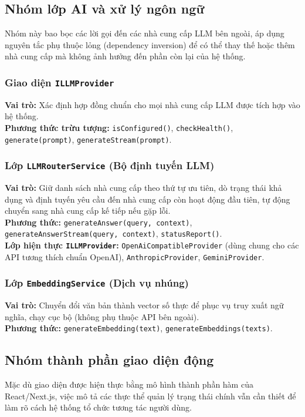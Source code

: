 \subsection{Nhóm lớp AI và xử lý ngôn ngữ}
Nhóm này bao bọc các lời gọi đến các nhà cung cấp LLM bên ngoài, áp dụng nguyên tắc phụ thuộc lỏng (dependency inversion) để có thể thay thế hoặc thêm nhà cung cấp mà không ảnh hưởng đến phần còn lại của hệ thống.

\subsubsection{Giao diện \texttt{ILLMProvider}}
    \noindent\textbf{Vai trò:} Xác định hợp đồng chuẩn cho mọi nhà cung cấp LLM được tích hợp vào hệ thống.\\
    \textbf{Phương thức trừu tượng:} \texttt{isConfigured()}, \texttt{checkHealth()}, \texttt{generate(prompt)}, \texttt{generateStream(prompt)}.

\subsubsection{Lớp \texttt{LLMRouterService} (Bộ định tuyến LLM)}
    \noindent\textbf{Vai trò:} Giữ danh sách nhà cung cấp theo thứ tự ưu tiên, dò trạng thái khả dụng và định tuyến yêu cầu đến nhà cung cấp còn hoạt động đầu tiên, tự động chuyển sang nhà cung cấp kế tiếp nếu gặp lỗi.\\
    \textbf{Phương thức:} \texttt{generateAnswer(query, context)}, \texttt{generateAnswerStream(query, context)}, \texttt{statusReport()}.\\
    \textbf{Lớp hiện thực \texttt{ILLMProvider}:} \texttt{OpenAiCompatibleProvider} (dùng chung cho các API tương thích chuẩn OpenAI), \texttt{AnthropicProvider}, \texttt{GeminiProvider}.

\subsubsection{Lớp \texttt{EmbeddingService} (Dịch vụ nhúng)}
    \noindent\textbf{Vai trò:} Chuyển đổi văn bản thành vector số thực để phục vụ truy xuất ngữ nghĩa, chạy cục bộ (không phụ thuộc API bên ngoài).\\
    \textbf{Phương thức:} \texttt{generateEmbedding(text)}, \texttt{generateEmbeddings(texts)}.

\subsection{Nhóm thành phần giao diện động}
Mặc dù giao diện được hiện thực bằng mô hình thành phần hàm của React/Next.js, việc mô tả các thực thể quản lý trạng thái chính vẫn cần thiết để làm rõ cách hệ thống tổ chức tương tác người dùng.

